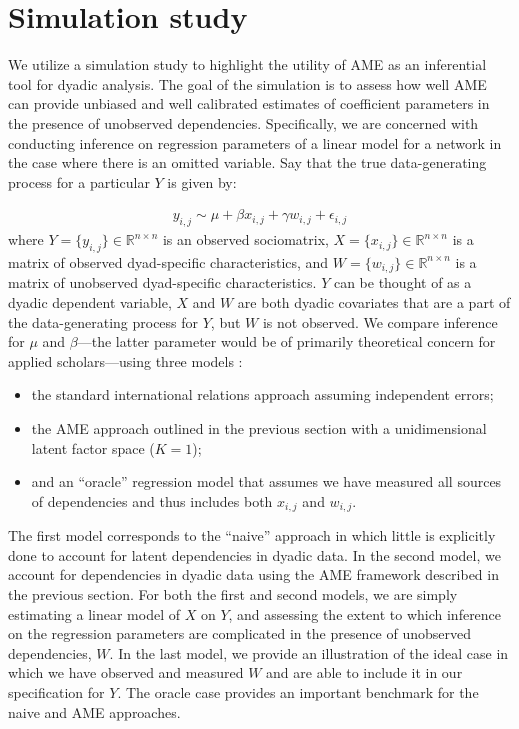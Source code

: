 \section{\textbf{Simulation study}}

We utilize a simulation study to highlight the utility of AME as an inferential tool for dyadic analysis. The goal of the simulation is to assess how well AME can provide unbiased and well calibrated estimates of coefficient parameters in the presence of unobserved dependencies. Specifically, we are concerned with conducting inference on regression parameters of a linear model for a network in the case where there is an omitted variable. Say that the true data-generating process for a particular $Y$ is given by:

\begin{align}
	y_{i,j} \sim  \mu + \beta x_{i,j} + \gamma w_{i,j} + \epsilon_{i,j}
	\label{eqn:sim}
\end{align}
where $Y= \{y_{i,j}\}\in \mathbb R^{n\times n}$ is an observed sociomatrix, $X = \{x_{i,j} \} \in \mathbb R^{n \times n}$ is a matrix of observed dyad-specific characteristics, and $W = \{ w_{i,j}\} \in \mathbb R^{n \times n}$ is a matrix of unobserved dyad-specific characteristics. $Y$ can be thought of as a dyadic dependent variable, $X$ and $W$ are both dyadic covariates that are a part of the data-generating process for $Y$, but $W$ is not observed. We compare inference for $\mu$ and $\beta$---the latter parameter would be of primarily theoretical concern for applied scholars---using three models :

\begin{itemize}
	\item the standard international relations approach assuming independent errors; 
	\item the AME approach outlined in the previous section with a unidimensional latent factor space ($K=1$);
	\item and an ``oracle'' regression model that assumes we have measured all sources of dependencies and thus includes both $x_{i,j}$ and $w_{i,j}$. 
\end{itemize}

The first model corresponds to the ``naive'' approach in which little is explicitly done to account for latent dependencies in dyadic data. In the second model, we account for dependencies in dyadic data using the AME framework described in the previous section. For both the first and second models, we are simply estimating a linear model of $X$ on $Y$, and assessing the extent to which inference on the regression parameters are complicated in the presence of unobserved dependencies, $W$. In the last model, we provide an illustration of the ideal case in which we have observed and measured $W$ and are able to include it in our specification for $Y$. The oracle case provides an important benchmark for the naive and AME approaches.

